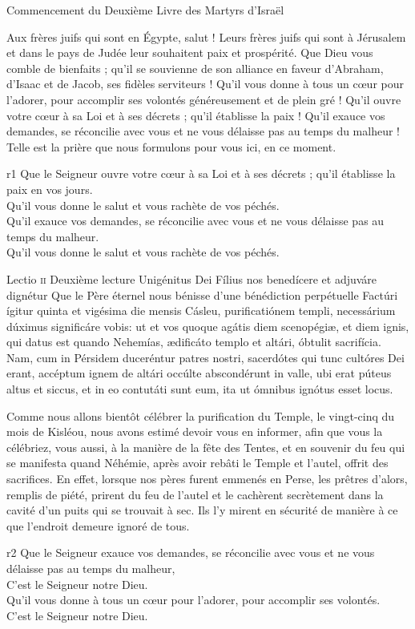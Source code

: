 \documentclass[twoside]{article}
\begin{document}
\begin{paracol}[1]{2}
{		Commencement du Deuxième Livre des Martyrs d'Israël
		
		Aux frères juifs qui sont en Égypte, salut ! Leurs frères juifs qui sont à Jérusalem et dans le pays de Judée leur souhaitent paix et prospérité.
		Que Dieu vous comble de bienfaits ; qu’il se souvienne de son alliance en faveur d’Abraham, d’Isaac et de Jacob, ses fidèles serviteurs !
		Qu’il vous donne à tous un cœur pour l’adorer, pour accomplir ses volontés généreusement et de plein gré !
		Qu’il ouvre votre cœur à sa Loi et à ses décrets ; qu’il établisse la paix !
		Qu’il exauce vos demandes, se réconcilie avec vous et ne vous délaisse pas au temps du malheur !
		Telle est la prière que nous formulons pour vous ici, en ce moment.
	}
	{r1}
	{\rr Que le Seigneur ouvre votre cœur à sa Loi et à ses décrets ; qu’il établisse la paix en vos jours.\\
	\GreSpecial{*} Qu'il vous donne le salut et vous rachète de vos péchés.\\
	\vv Qu’il exauce vos demandes, se réconcilie avec vous et ne vous délaisse pas au temps du malheur.\\
	\GreSpecial{*} Qu'il vous donne le salut et vous rachète de vos péchés.}

\lectioresponsorium
	{Lectio \textsc{ii}}
	{Deuxième lecture}
	{Unigénitus Dei Fílius nos benedícere et adjuváre dignétur}
	{Que le Père éternel nous bénisse d'une bénédiction perpétuelle}
	{
		Factúri ígitur quinta et vigésima die mensis Cásleu, purificatiónem templi, necessárium dúximus significáre vobis: ut et vos quoque agátis diem scenopégiæ, et diem ignis, qui datus est quando Nehemías, ædificáto templo et altári, óbtulit sacrifícia.
		Nam, cum in Pérsidem duceréntur patres nostri, sacerdótes qui tunc cultóres Dei erant, accéptum ignem de altári occúlte abscondérunt in valle, ubi erat púteus altus et siccus, et in eo contutáti sunt eum, ita ut ómnibus ignótus esset locus.
	}
	{	
	
		Comme nous allons bientôt célébrer la purification du Temple, le vingt-cinq du mois de Kisléou, nous avons estimé devoir vous en informer, 
		afin que vous la célébriez, vous aussi, à la manière de la fête des Tentes, et en souvenir du feu qui se manifesta quand Néhémie, 
		après avoir rebâti le Temple et l’autel, offrit des sacrifices.
		En effet, lorsque nos pères furent emmenés en Perse, les prêtres d’alors, remplis de piété,
		prirent du feu de l’autel et le cachèrent secrètement dans la cavité d’un puits qui se trouvait à sec.
		Ils l’y mirent en sécurité de manière à ce que l’endroit demeure ignoré de tous.
	}
	{r2}
	{\rr Que le Seigneur exauce vos demandes, se réconcilie avec vous et ne vous délaisse pas au temps du malheur,\\
	\GreSpecial{*} C'est le Seigneur notre Dieu.\\
	\vv Qu’il vous donne à tous un cœur pour l’adorer, pour accomplir ses volontés.\\
	\GreSpecial{*} C'est le Seigneur notre Dieu.}


\end{paracol}
\end{document}
